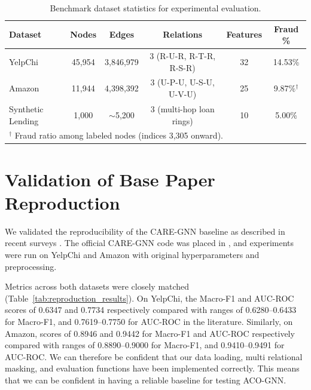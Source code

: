 \begin{table}[htbp]
\centering
\footnotesize
\setlength{\tabcolsep}{2pt}
\caption[Benchmark dataset statistics]{Benchmark dataset statistics for experimental evaluation.}
\label{tab:dataset_summary}
\begin{tabular*}{\textwidth}{@{\extracolsep{\fill}}lccccc}
\toprule
\textbf{Dataset} & \textbf{Nodes} & \textbf{Edges} & \textbf{Relations} & \textbf{Features} & \textbf{Fraud \%} \\
\midrule
YelpChi   & 45,954  & 3,846,979  & 3 (R-U-R, R-T-R, R-S-R) & 32  & 14.53\% \\
Amazon    & 11,944  & 4,398,392  & 3 (U-P-U, U-S-U, U-V-U) & 25  & 9.87\%$^{\dagger}$ \\
Synthetic Lending & 1,000   & $\sim$5,200 & 3 (multi-hop loan rings) & 10  & 5.00\% \\
\bottomrule
\multicolumn{6}{l}{\footnotesize $^{\dagger}$ Fraud ratio among labeled nodes (indices 3,305 onward).}
\end{tabular*}
\end{table}

\section[Validation of Base Paper Reproduction]{Validation of Base Paper Reproduction}
\label{sec:reproduction_validation}

We validated the reproducibility of the CARE-GNN baseline as described in recent surveys \cite{cheng2025graph}. The official CARE-GNN code was placed in , and experiments were run on YelpChi and Amazon with original hyperparameters and preprocessing.

Metrics across both datasets were closely matched (Table~\ref{tab:reproduction_results}). On YelpChi, the Macro-F1 and AUC-ROC scores of 0.6347 and 0.7734 respectively compared with ranges of 0.6280--0.6433 for Macro-F1, and 0.7619--0.7750 for AUC-ROC in the literature. Similarly, on Amazon, scores of 0.8946 and 0.9442 for Macro-F1 and AUC-ROC respectively compared with ranges of 0.8890--0.9000 for Macro-F1, and 0.9410--0.9491 for AUC-ROC. We can therefore be confident that our data loading, multi relational masking, and evaluation functions have been implemented correctly. This means that we can be confident in having a reliable baseline for testing ACO-GNN.

